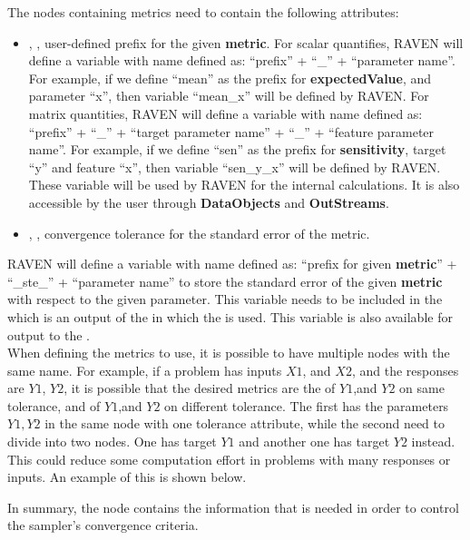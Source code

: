 {\begin{itemize}
      The nodes containing metrics need to contain the following attributes:
      \begin{itemize}
        \itemsep0em
        \item {}, , user-defined prefix for the given \textbf{metric}.
          For scalar quantifies, RAVEN will define a variable with name defined as:  ``prefix'' + ``\_'' + ``parameter name''.
          For example, if we define ``mean'' as the prefix for \textbf{expectedValue}, and parameter ``x'', then variable
          ``mean\_x'' will be defined by RAVEN.
          For matrix quantities, RAVEN will define a variable with name defined as: ``prefix'' + ``\_'' + ``target parameter name'' + ``\_'' + ``feature parameter name''.
          For example, if we define ``sen'' as the prefix for \textbf{sensitivity}, target ``y'' and feature ``x'', then
          variable ``sen\_y\_x'' will be defined by RAVEN.
          \nb These variable will be used by RAVEN for the internal calculations. It is also accessible by the user through
          \textbf{DataObjects} and \textbf{OutStreams}.

          \item {}, , convergence tolerance for the standard error of the metric.

      \end{itemize}
      \vspace{12pt}
      RAVEN will define a variable with name defined as: ``prefix for given \textbf{metric}'' + ``\_ste\_'' + ``parameter name'' to
      store the standard error of the given \textbf{metric} with respect to the given parameter. This variable needs to be included in the   which is an output of the  in which the  is used. This variable is also available for output to the  .  \\

      \nb When defining the metrics to use, it is possible to have multiple nodes with the same name.  For
      example, if a problem has inputs $X1$, and $X2$, and the responses are $Y1$, $Y2$, it is possible that
      the desired metrics are the  of $Y1$,and $Y2$ on same tolerance, and 
      of $Y1$,and $Y2$ on different tolerance. The first has the parameters $Y1,Y2$ in the same node with one
      tolerance attribute, while the second need to divide into two nodes. One has target $Y1$ and another one
      has target $Y2$ instead.  This could reduce some computation effort in problems with many responses or inputs.
      An example of this is shown below.\\

    \end{itemize}

    In summary, the  node contains the information that is needed in order
    to control the  sampler's convergence criteria.
}
%


